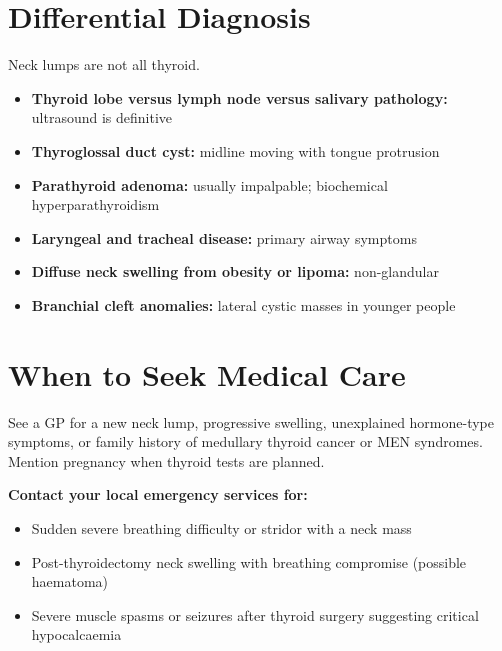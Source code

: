 \section*{Differential Diagnosis}
Neck lumps are not all thyroid.

\begin{itemize}
    \item \textbf{Thyroid lobe versus lymph node versus salivary pathology:} ultrasound is definitive
    \item \textbf{Thyroglossal duct cyst:} midline moving with tongue protrusion
    \item \textbf{Parathyroid adenoma:} usually impalpable; biochemical hyperparathyroidism
    \item \textbf{Laryngeal and tracheal disease:} primary airway symptoms
    \item \textbf{Diffuse neck swelling from obesity or lipoma:} non-glandular
    \item \textbf{Branchial cleft anomalies:} lateral cystic masses in younger people
\end{itemize}

\section*{When to Seek Medical Care}
See a GP for a new neck lump, progressive swelling, unexplained hormone-type symptoms, or family history of medullary thyroid cancer or MEN syndromes. Mention pregnancy when thyroid tests are planned.

\textbf{Contact your local emergency services for:}
\begin{itemize}
    \item Sudden severe breathing difficulty or stridor with a neck mass
    \item Post-thyroidectomy neck swelling with breathing compromise (possible haematoma)
    \item Severe muscle spasms or seizures after thyroid surgery suggesting critical hypocalcaemia
\end{itemize}


